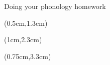 \documentclass{beamer}
\begin{document}
\begin{frame}{Doing your phonology homework}
  \begin{textblock*}{10cm}(0.5cm,1.3cm)\end{textblock*}
  \begin{textblock*}{10cm}(1cm,2.3cm)\end{textblock*}
  \begin{textblock*}{10cm}(0.75cm,3.3cm)\end{textblock*}
\end{frame}
\end{document}

